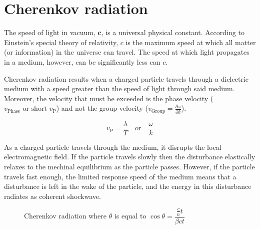 \documentclass[11pt,twoside]{scrreprt}
\begin{document}
\section{Cherenkov radiation} %
\label{sec:cherenkov_radiation}

The speed of light in vacuum, \( \mathbf{c} \), is a universal physical constant. According to Einstein's special theory of relativity, \( c \) is the maximum speed at which all matter (or information) in the universe can travel. The speed at which light propagates in a medium, however, can be significantly less can \( c \).

Cherenkov radiation results when a charged particle travels through a dielectric medium with a speed greater than the speed of light through said medium. Moreover, the velocity that must be exceeded is the phase velocity (\( v_{\text{Phase}} \text{ or short } v_{\text{P}} \)) and not the group velocity (\( v_{\text{Group}} = \frac{\partial \omega}{\partial k} \)).

\[ v_{\text{P}} = \frac{\lambda}{T} \quad \text{or} \quad \frac{\omega}{k}\]

As a charged particle travels through the medium, it disrupts the local electromagnetic field. If the particle travels slowly then the disturbance elastically relaxes to the mechinal equilibrium as the particle passes. However, if the particle travels fast enough, the limited response speed of the medium means that a disturbance is left in the wake of the particle, and the energy in this disturbance radiates as coherent shockwave.

\begin{figure}[htbp]
  \centering
  \caption{Cherenkov radiation where $\theta$ is equal to $\cos\theta = \dfrac{\frac{c}{n}t}{\beta ct}$}
  \label{fig:label}
\end{figure}
\end{document}
